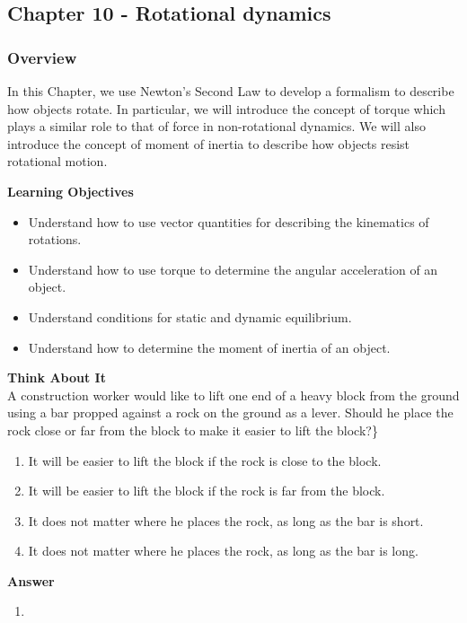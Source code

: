 \subsection{Chapter 10 - Rotational dynamics}

\subsubsection{Overview}\label{chap:rotationaldynamics}

In this Chapter, we use Newton's Second Law to develop a formalism to describe how objects rotate. In particular, we will introduce the concept of torque which plays a similar role to that of force in non-rotational dynamics. We will also introduce the concept of moment of inertia to describe how objects resist rotational motion.

\begin{framed}
\textbf{Learning Objectives}\\
\begin{itemize}
\item Understand how to use vector quantities for describing the kinematics of rotations.
\item Understand how to use torque to determine the angular acceleration of an object.
\item Understand conditions for static and dynamic equilibrium.
\item Understand how to determine the moment of inertia of an object.
\end{itemize}
\end{framed}

\begin{framed}
\textbf{Think About It}\\
A construction worker would like to lift one end of a heavy block from the ground using a bar propped against a rock on the ground as a lever. Should he place the rock close or far from the block to make it easier to lift the block?\}

\begin{enumerate}
\item It will be easier to lift the block if the rock is close to the block.
\item It will be easier to lift the block if the rock is far from the block.
\item It does not matter where he places the rock, as long as the bar is short.
\item It does not matter where he places the rock, as long as the bar is long.
\end{enumerate}

\begin{framed}
\textbf{Answer}\\
\begin{enumerate}
\item
\end{enumerate}
\end{framed}
\end{framed}

